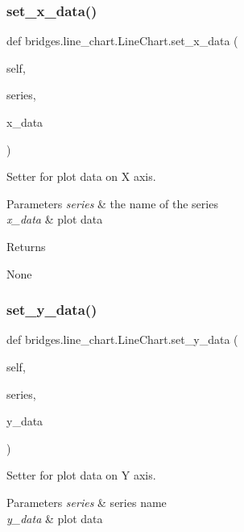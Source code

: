 \subsubsection{\texorpdfstring{set\+\_\+x\+\_\+data()}{set\_x\_data()}}
{\footnotesize\ttfamily def bridges.\+line\+\_\+chart.\+Line\+Chart.\+set\+\_\+x\+\_\+data (\begin{DoxyParamCaption}\item[{}]{self,  }\item[{}]{series,  }\item[{}]{x\+\_\+data }\end{DoxyParamCaption})}



Setter for plot data on X axis. 


\begin{DoxyParams}{Parameters}
{\em series} & the name of the series \\
\hline
{\em x\+\_\+data} & plot data \\
\hline
\end{DoxyParams}
\begin{DoxyReturn}{Returns}


None 
\end{DoxyReturn}
\mbox{\label{classbridges_1_1line__chart_1_1_line_chart_ae5988ed81be128f96d63526560c61d9f}} 
\subsubsection{\texorpdfstring{set\+\_\+y\+\_\+data()}{set\_y\_data()}}
{\footnotesize\ttfamily def bridges.\+line\+\_\+chart.\+Line\+Chart.\+set\+\_\+y\+\_\+data (\begin{DoxyParamCaption}\item[{}]{self,  }\item[{}]{series,  }\item[{}]{y\+\_\+data }\end{DoxyParamCaption})}



Setter for plot data on Y axis. 


\begin{DoxyParams}{Parameters}
{\em series} & series name \\
\hline
{\em y\+\_\+data} & plot data \\
\hline
\end{DoxyParams}
\mbox{\label{classbridges_1_1line__chart_1_1_line_chart_a3361674c961f45bfa058cff38ba49bd8}} 
